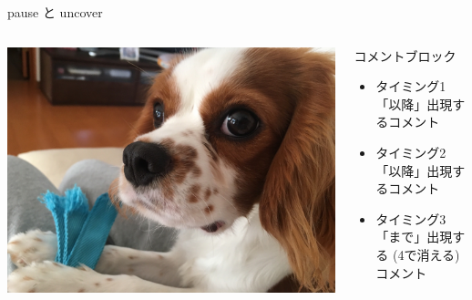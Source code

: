 \documentclass[dvipdfmx]{beamer}  %
\begin{document}
\begin{frame}{pause と uncover}

  \begin{columns}[c]  %

    \begin{column}{0.3\textwidth}
      \includegraphics[width=\columnwidth]{./media/kenta2.jpg}
    \end{column}

    \begin{column}{0.65\textwidth} %
      \begin{block}{コメントブロック}
        \begin{itemize}
          \item<1-> タイミング1「以降」出現するコメント
          \item<2-> タイミング2「以降」出現するコメント
          \item<-3> タイミング3「まで」出現する (4で消える) コメント
        \end{itemize}
      \end{block}
    \end{column}

  \end{columns}



\end{frame}

\end{document}
